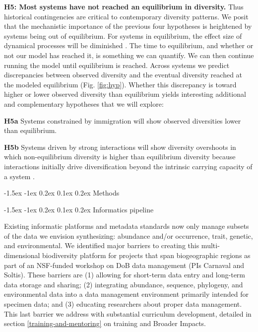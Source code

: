 \documentclass[11pt]{article}
\makeatletter
\renewcommand\subsection{\@startsection{subsection}{1}{\z@}%
                                  {-1.5ex \@plus -1ex \@minus 0.2ex}%
                                  {0.1ex \@plus 0.2ex}%
                                  {\normalfont\large\bfseries}}
\renewcommand\subsubsection{\@startsection{subsection}{1}{\z@}%
                                  {-1.5ex \@plus -1ex \@minus 0.2ex}%
                                  {0.1ex \@plus 0.2ex}%
                                  {\normalfont\bfseries}}
\makeatother
\begin{document}
\textbf{H5: Most systems have not reached an equilibrium in
  diversity.}  Thus historical contingencies are critical to
contemporary diversity patterns. We posit that the mechanistic
importance of the previous four hypotheses is heightened by systems
being out of equilibrium. For systems in equilibrium, the effect size
of dynamical processes will be diminished \cite{Rabosky2009-gs}. The
time to equilibrium, and whether or not our model has reached it, is
something we can quantify. We can then continue running the model
until equilibrium is reached. Across systems we predict discrepancies
between observed diversity and the eventual diversity reached at the
modeled equilibrium (Fig. \ref{fig:hyp}). Whether this discrepancy is
toward higher or lower observed diversity than equilibrium yields
interesting additional and complementary hypotheses that we will
explore:

\begin{adjustwidth}{2.5em}{0pt}
\hspace{1.5em}\textbf{H5a} Systems constrained by immigration \citep[e.g.~arthropod
communities on young substrates in Hawaii;][]{Rominger2015-kb} will
show observed diversities lower than equilibrium.

\textbf{H5b} Systems driven by strong interactions will show diversity
overshoots in which non-equilibrium diversity is higher than equilibrium
diversity because interactions initially drive diversification beyond
the intrinsic carrying capacity of a system \cite{Gillespie2010-bv}.
\end{adjustwidth}

\subsection{Methods}\label{methods}

\subsubsection{Informatics pipeline}\label{informatics-pipeline}

Existing informatic platforms and metadata standards now only manage
subsets of the data we envision synthesizing: abundance and/or
occurrence, trait, genetic, and environmental. We identified major
barriers to creating this multi-dimensional biodiversity platform for
projects that span biogeographic regions as part of an NSF-funded
workshop on DoB data management (PIs Carnaval and Soltis). These
barriers are (1) allowing for short-term data entry and long-term data
storage and sharing; (2) integrating abundance, sequence, phylogeny,
and environmental data into a data management environment primarily
intended for specimen data; and (3) educating researchers about proper
data management. This last barrier we address with substantial
curriculum development, detailed in section
\ref{training-and-mentoring} on training and Broader Impacts.
\end{document}
